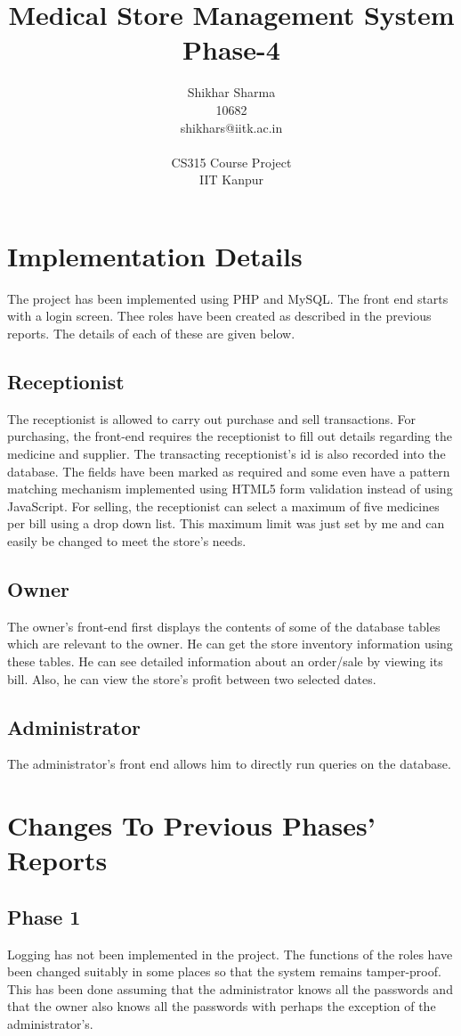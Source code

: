\documentclass[a4paper]{article}
\title{{\bf Medical Store Management System}\\Phase-4}
\author{Shikhar Sharma\\10682\\shikhars@iitk.ac.in\\\\CS315 Course Project\\IIT Kanpur}
\begin{document}
\maketitle
\tableofcontents

\newpage
\section{Implementation Details}
	The project has been implemented using PHP and MySQL. The front end starts with a login screen. Thee roles have been created as described in the previous reports. The details of each of these are given below.
	\subsection{Receptionist}
		The receptionist is allowed to carry out purchase and sell transactions. For purchasing, the front-end requires the receptionist to fill out details regarding the medicine and supplier. The transacting receptionist's id is also recorded into the database. The fields have been marked as required and some even have a pattern matching mechanism implemented using HTML5 form validation instead of using JavaScript. For selling, the receptionist can select a maximum of five medicines per bill using a drop down list. This maximum limit was just set by me and can easily be changed to meet the store's needs.
	\subsection{Owner}
		The owner's front-end first displays the contents of some of the database tables which are relevant to the owner. He can get the store inventory information using these tables. He can see detailed information about an order/sale by viewing its bill. Also, he can view the store's profit between two selected dates.
	\subsection{Administrator}
		The administrator's front end allows him to directly run queries on the database.

\section{Changes To Previous Phases' Reports}
	\subsection{Phase 1}
		Logging has not been implemented in the project. The functions of the roles have been changed suitably in some places so that the system remains tamper-proof. This has been done assuming that the administrator knows all the passwords and that the owner also knows all the passwords with perhaps the exception of the administrator's.
\end{document}
